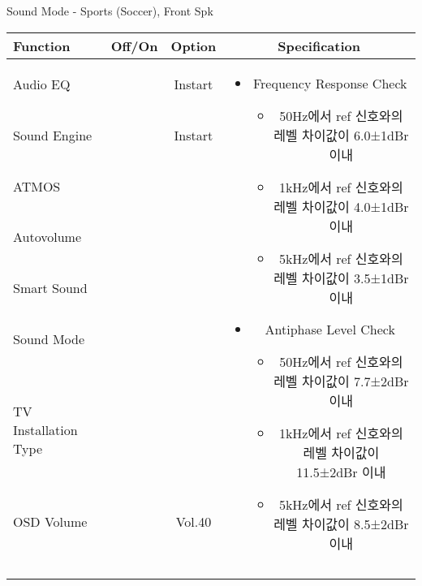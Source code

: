 \begin{frame}[t]{Sound Mode - Sports (Soccer), Front Spk}
\begin{tiny}
\begin{tabular}{@{}lccc@{}}
\toprule
Function & Off/On & Option & Specification \\
\midrule
Audio EQ & \color{black}{Off} & Instart &
\multirow{10}{60mm}{
\begin{itemize}
\item Frequency Response Check
	\begin{itemize}
	\item 50Hz에서 ref 신호와의 레벨 차이값이 6.0±1dBr 이내
	\item 1kHz에서 ref 신호와의 레벨 차이값이 4.0±1dBr 이내
	\item 5kHz에서 ref 신호와의 레벨 차이값이 3.5±1dBr 이내
	\end{itemize}
\item Antiphase Level Check
	\begin{itemize}
	\item 50Hz에서 ref 신호와의 레벨 차이값이 7.7±2dBr 이내
	\item 1kHz에서 ref 신호와의 레벨 차이값이 11.5±2dBr 이내
	\item 5kHz에서 ref 신호와의 레벨 차이값이 8.5±2dBr 이내
	\end{itemize}
\end{itemize}
} \\
Sound Engine & \color{blue}{On} & Instart & \\
ATMOS & \color{black}{Off}  & & \\
Autovolume & \color{black}{Off} & & \\
Smart Sound & \color{black}{Off} & & \\
Sound Mode & \color{blue}{On} & \color{blue}{Sports} & \\
TV Installation Type & \color{blue}{On} & \color{black}{Standtype1} & \\
OSD Volume & \color{blue}{On} & Vol.40 & \\
& & & \\
& & & \\
& & & \\
& & & \\
\midrule
\end{tabular}
\end{tiny}


\end{frame}


